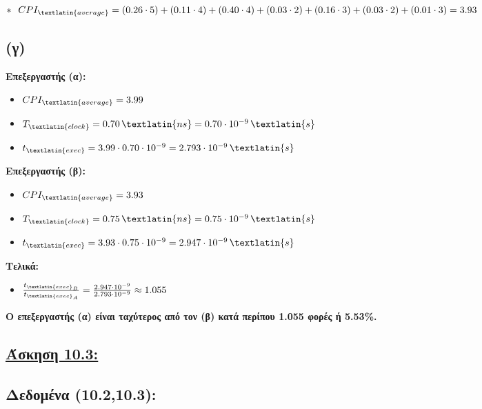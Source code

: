 \documentclass{article}
\newcommand{\skato}{\hspace{0.25cm}}
\begin{document}
$
* \skato CPI_{\textlatin{average}} = (0.26 \cdot 5) + (0.11 \cdot 4) + (0.40 \cdot 4) + (0.03 \cdot 2) + (0.16 \cdot 3) + (0.03 \cdot 2) + (0.01 \cdot 3) = 3.93
$


\subsection*{\textbf{(γ)}}


\textbf{Επεξεργαστής (α):}
    \begin{itemize}
        \item \( CPI_{\textlatin{average}} = 3.99 \)
        \item \( T_{\textlatin{clock}} = 0.70 \, \textlatin{ns} = 0.70 \cdot 10^{-9} \, \textlatin{s} \)
        \item $t_{\textlatin{exec}} = 3.99 \cdot 0.70 \cdot 10^{-9} = 2.793 \cdot 10^{-9} \, \textlatin{s} $
    \end{itemize}
\textbf{Επεξεργαστής (β):}
    \begin{itemize}
        \item \( CPI_{\textlatin{average}} = 3.93 \)
        \item \( T_{\textlatin{clock}} = 0.75 \, \textlatin{ns} = 0.75 \cdot 10^{-9} \, \textlatin{s} \)
        \item  $ t_{\textlatin{exec}} = 3.93 \cdot 0.75 \cdot 10^{-9} = 2.947 \cdot 10^{-9} \, \textlatin{s} $
    \end{itemize}
\textbf{Τελικά:}
    \begin{itemize} 
        \item  $ \frac{t_{\textlatin{exec}_B}}{t_{\textlatin{exec}_A}} = \frac{2.947 \cdot 10^{-9}}{2.793 \cdot 10^{-9}} \approx 1.055 $
    \end{itemize}
\textbf{Ο επεξεργαστής (α) είναι ταχύτερος από τον (β) κατά περίπου 1.055 φορές ή 5.53\%.}











\newpage
\subsection*{\underline{\textbf{Άσκηση 10.3:}}}
\vspace{0.5cm}




\subsection*{\textbf{Δεδομένα (10.2,10.3):}}
\end{document}
